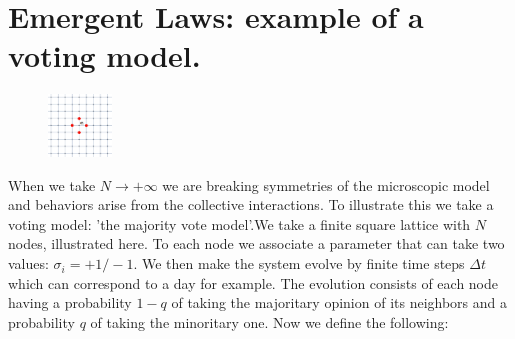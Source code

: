 \documentclass[10pt,a4paper]{book}
\begin{document}
\section{Emergent Laws: example of a voting model.}
\begin{figure}\includegraphics[width=0.15\textwidth]{graphs/SquareLattice}\end{figure}
When we take $N \to + \infty$ we are breaking symmetries of the microscopic model and behaviors arise from the collective interactions. To illustrate this we take a voting model: 'the majority vote model'.We take a finite square lattice with $N$ nodes, illustrated here. To each node we associate a parameter that can take two values: $\sigma_i = +1/-1$. We then make the system evolve by finite time steps $\Delta t$ which can correspond to a day for example. The evolution consists of each node having a probability $1-q$ of taking the majoritary opinion of its neighbors and a probability $q$ of taking the minoritary one. Now we define the following:
\end{document}
